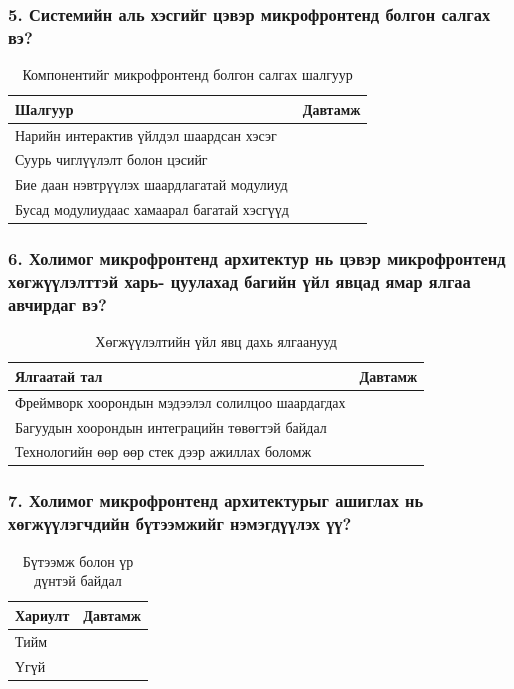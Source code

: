 \subsubsection{5. Системийн аль хэсгийг цэвэр микрофронтенд болгон салгах вэ?}
\begin{table}[h!]
\centering
\renewcommand{\arraystretch}{0.7}
\begin{tabular}{lc}
\toprule
\textbf{Шалгуур} & \textbf{Давтамж} \\ 
\midrule
Нарийн интерактив үйлдэл шаардсан хэсэг & \\ 
Суурь чиглүүлэлт болон цэсийг & \\ 
Бие даан нэвтрүүлэх шаардлагатай модулиуд & \\ 
Бусад модулиудаас хамаарал багатай хэсгүүд & \\ 
\bottomrule
\end{tabular}
\caption{Компонентийг микрофронтенд болгон салгах шалгуур}
\label{tab:allocation_criteria}
\end{table}

\subsubsection{6. Холимог микрофронтенд архитектур нь цэвэр микрофронтенд хөгжүүлэлттэй харь- цуулахад багийн үйл явцад ямар ялгаа авчирдаг вэ?}
\begin{table}[h!]
\centering
\renewcommand{\arraystretch}{0.7}
\begin{tabular}{lc}
\toprule
\textbf{Ялгаатай тал} & \textbf{Давтамж} \\ 
\midrule
Фреймворк хоорондын мэдээлэл солилцоо шаардагдах & \\ 
Багуудын хоорондын интеграцийн төвөгтэй байдал & \\ 
Технологийн өөр өөр стек дээр ажиллах боломж & \\ 
\bottomrule
\end{tabular}
\caption{Хөгжүүлэлтийн үйл явц дахь ялгаанууд}
\label{tab:dev_differences}
\end{table}

\subsubsection{7. Холимог микрофронтенд архитектурыг ашиглах нь хөгжүүлэгчдийн бүтээмжийг нэмэгдүүлэх үү?}
\begin{table}[h!]
\centering
\renewcommand{\arraystretch}{0.7}
\begin{tabular}{lc}
\toprule
\textbf{Хариулт} & \textbf{Давтамж} \\ 
\midrule
Тийм & \\ 
Үгүй & \\ 
\bottomrule
\end{tabular}
\caption{Бүтээмж болон үр дүнтэй байдал}
\label{tab:productivity}
\end{table}

